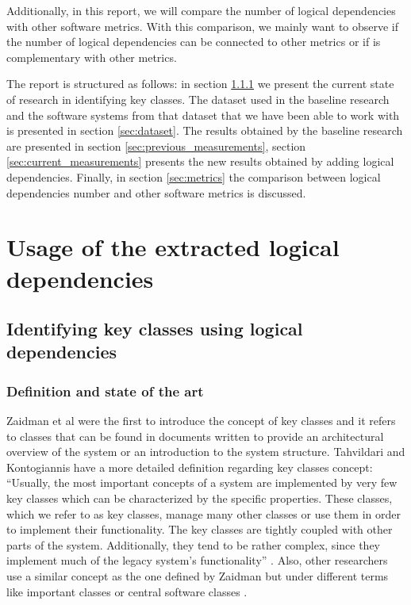\documentclass[12pt]{mitthesis}
\begin{document}
Additionally, in this report, we will compare the number of logical dependencies with other software metrics. With this comparison, we mainly want to observe if the number of logical dependencies can be connected to other metrics or if is complementary with other metrics.

The report is structured as follows: in section \ref{sec:definition} we present the current state of research in identifying key classes. The dataset used in the baseline research and the software systems from that dataset that we have been able to work with is presented in section \ref{sec:dataset}.  The results obtained by the baseline research are presented in section \ref{sec:previous_measurements}, section \ref{sec:current_measurements} presents the new results obtained by adding logical dependencies.
Finally, in section \ref{sec:metrics} the comparison between logical dependencies number and other software metrics is discussed. 


\chapter{Usage of the extracted logical dependencies}

\section{Identifying key classes using logical dependencies}
\subsection{Definition and state of the art}
\label{sec:definition}
Zaidman et al \cite{ZaidmanJurnal} were the first to introduce the concept of key classes and it refers to classes that can be found in documents written to provide an architectural overview of the system or an introduction to the system structure. 
Tahvildari and Kontogiannis have a more detailed definition regarding key classes concept: “Usually, the most important concepts of a system are implemented by very few key classes which can be characterized by the specific properties. These classes, which we refer to as key classes, manage many other classes or use them in order to implement their functionality. The key classes are tightly coupled with other parts of the system. Additionally, they tend to be rather complex, since they implement much of the legacy system’s functionality” \cite{Tahvildari2004ImprovingDQ}.
Also, other researchers use a similar concept as the one defined by Zaidman but under different terms like important classes  \cite{Meyer2014IdentifyingIC} or central software classes \cite{CentralClassesSteidl}.
\end{document}
